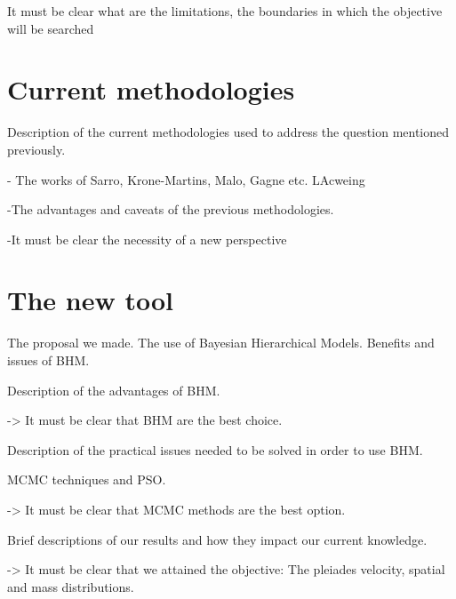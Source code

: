 It must be clear what are the limitations, the boundaries in which the objective will be searched

\section{Current methodologies}
\label{sect:current_methodologies}
Description of the current methodologies used to address the question mentioned previously.

- The works of Sarro, Krone-Martins, Malo, Gagne etc. LAcweing

-The advantages and caveats of the previous methodologies. 

-It must be clear the necessity of a new perspective

\section{The new tool}
\label{sect:newtool}

The proposal we made. The use of Bayesian Hierarchical Models. Benefits and issues of BHM.

Description of the advantages of BHM.

-> It must be clear that BHM are the best choice.

Description of the practical issues needed to be solved in order to use BHM.

MCMC techniques and  PSO.

-> It must be clear that MCMC methods are the best option.

Brief descriptions of our results and how they impact our current knowledge.

-> It must be clear that we attained the objective: The pleiades velocity, spatial and mass distributions.
 



